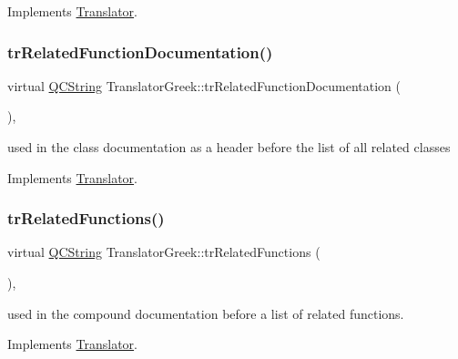 Implements \mbox{\hyperlink{class_translator}{Translator}}.

\mbox{\label{class_translator_greek_a6e90d9667c4cf90aa0f8022f2ec74b83}} 
\subsubsection{\texorpdfstring{trRelatedFunctionDocumentation()}{trRelatedFunctionDocumentation()}}
{\footnotesize\ttfamily virtual \mbox{\hyperlink{class_q_c_string}{Q\+C\+String}} Translator\+Greek\+::tr\+Related\+Function\+Documentation (\begin{DoxyParamCaption}{ }\end{DoxyParamCaption})\hspace{0.3cm}{\ttfamily [inline]}, {\ttfamily [virtual]}}

used in the class documentation as a header before the list of all related classes 

Implements \mbox{\hyperlink{class_translator}{Translator}}.

\mbox{\label{class_translator_greek_aaa6ef2ace977a5b61b084b7022497793}} 
\subsubsection{\texorpdfstring{trRelatedFunctions()}{trRelatedFunctions()}}
{\footnotesize\ttfamily virtual \mbox{\hyperlink{class_q_c_string}{Q\+C\+String}} Translator\+Greek\+::tr\+Related\+Functions (\begin{DoxyParamCaption}{ }\end{DoxyParamCaption})\hspace{0.3cm}{\ttfamily [inline]}, {\ttfamily [virtual]}}

used in the compound documentation before a list of related functions. 

Implements \mbox{\hyperlink{class_translator}{Translator}}.

\mbox{\label{class_translator_greek_ae229dd5cc8b9c00e336402ce02da95ae}} 
